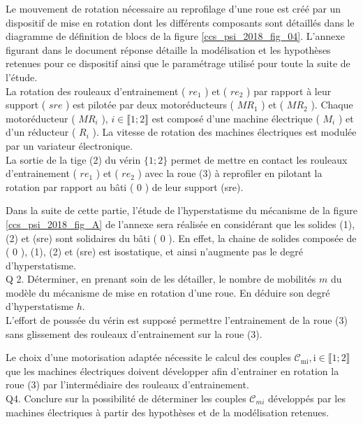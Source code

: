 Le mouvement de rotation nécessaire au reprofilage d'une roue est créé par un dispositif de mise en rotation dont les différents composants sont détaillés dans le diagramme de définition de blocs de la figure \ref{ccs_psi_2018_fig_04}. L'annexe figurant dans le document réponse détaille la modélisation et les hypothèses retenues pour ce dispositif ainsi que le paramétrage utilisé pour toute la suite de l'étude.\\
La rotation des rouleaux d'entrainement ( $r e_{1}$ ) et ( $r e_{2}$ ) par rapport à leur support ( $s r e$ ) est pilotée par deux motoréducteurs ( $M R_{1}$ ) et ( $M R_{2}$ ). Chaque motoréducteur ( $M R_{i}$ ), $i \in \llbracket 1 ; 2 \rrbracket$ est composé d'une machine électrique ( $M_{i}$ ) et d'un réducteur ( $R_{i}$ ). La vitesse de rotation des machines électriques est modulée par un variateur électronique.\\
La sortie de la tige (2) du vérin $\{1 ; 2\}$ permet de mettre en contact les rouleaux d'entrainement ( $r e_{1}$ ) et ( $r e_{2}$ ) avec la roue (3) à reprofiler en pilotant la rotation par rapport au bâti ( 0 ) de leur support (sre).

Dans la suite de cette partie, l'étude de l'hyperstatisme du mécanisme de la figure \ref{ccs_psi_2018_fig_A} de l'annexe sera réalisée en considérant que les solides (1), (2) et (sre) sont solidaires du bâti ( 0 ). En effet, la chaine de solides composée de ( 0 ), (1), (2) et (sre) est isostatique, et ainsi n'augmente pas le degré d'hyperstatisme.\\
Q 2. Déterminer, en prenant soin de les détailler, le nombre de mobilités $m$ du modèle du mécanisme de mise en rotation d'une roue. En déduire son degré d'hyperstatisme $h$.\\
L'effort de poussée du vérin est supposé permettre l'entrainement de la roue (3) sans glissement des rouleaux d'entrainement sur la roue (3).\\


Le choix d'une motorisation adaptée nécessite le calcul des couples $\mathcal{C}_{\mathrm{mi}}, \mathrm{i} \in \llbracket 1 ; 2 \rrbracket$ que les machines électriques doivent développer afin d'entrainer en rotation la roue (3) par l'intermédiaire des rouleaux d'entrainement.\\
Q4. Conclure sur la possibilité de déterminer les couples $\mathcal{C}_{m i}$ développés par les machines électriques à partir des hypothèses et de la modélisation retenues.

